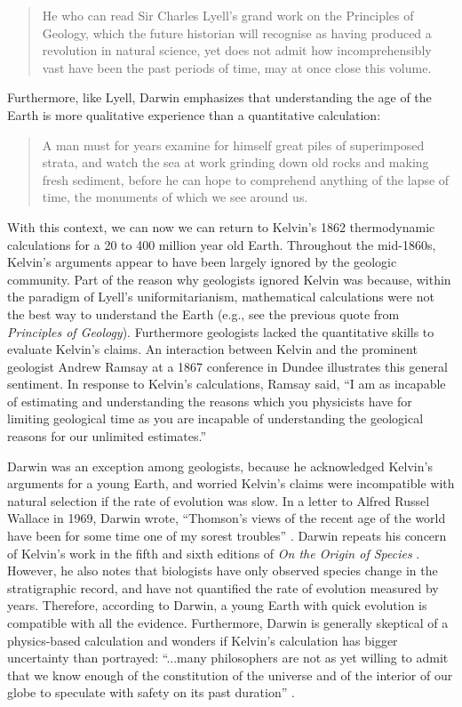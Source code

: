 \documentclass[12pt]{article}
\begin{document}
\begin{quote}
  He who can read Sir Charles Lyell's grand work on the Principles of Geology, which the future historian will recognise as having produced a revolution in natural science, yet does not admit how incomprehensibly vast have been the past periods of time, may at once close this volume. \citep{Darwin_1859}
\end{quote}
Furthermore, like Lyell, Darwin emphasizes that understanding the age of the Earth is more qualitative experience than a quantitative calculation:

\begin{quote}
  A man must for years examine for himself great piles of superimposed strata, and watch the sea at work grinding down old rocks and making fresh sediment, before he can hope to comprehend anything of the lapse of time, the monuments of which we see around us. \citep{Darwin_1859}
\end{quote}

With this context, we can now we can return to Kelvin's 1862 thermodynamic calculations for a 20 to 400 million year old Earth. Throughout the mid-1860s, Kelvin's arguments appear to have been largely ignored by the geologic community. Part of the reason why geologists ignored Kelvin was because, within the paradigm of Lyell's uniformitarianism, mathematical calculations were not the best way to understand the Earth (e.g., see the previous quote from \emph{Principles of Geology}). Furthermore geologists lacked the quantitative skills to evaluate Kelvin's claims. An interaction between Kelvin and the prominent geologist Andrew Ramsay at a 1867 conference in Dundee illustrates this general sentiment. In response to Kelvin's calculations, Ramsay said, ``I am as incapable of estimating and understanding the reasons which you physicists have for limiting geological time as you are incapable of understanding the geological reasons for our unlimited estimates.''

Darwin was an exception among geologists, because he acknowledged Kelvin's arguments for a young Earth, and worried Kelvin's claims were incompatible with natural selection if the rate of evolution was slow. In a letter to Alfred Russel Wallace in 1969, Darwin wrote, ``Thomson's views of the recent age of the world have been for some time one of my sorest troubles'' \citep{Marchant_1916}. Darwin repeats his concern of Kelvin's work in the fifth and sixth editions of \emph{On the Origin of Species} \citep{Darwin_1869,Darwin_1872}. However, he also notes that biologists have only observed species change in the stratigraphic record, and have not quantified the rate of evolution measured by years. Therefore, according to Darwin, a young Earth with quick evolution is compatible with all the evidence. Furthermore, Darwin is generally skeptical of a physics-based calculation and wonders if Kelvin's calculation has bigger uncertainty than portrayed: ``...many philosophers are not as yet willing to admit that we know enough of the constitution of the universe and of the interior of our globe to speculate with safety on its past duration'' \citep{Darwin_1872}.
\end{document}
